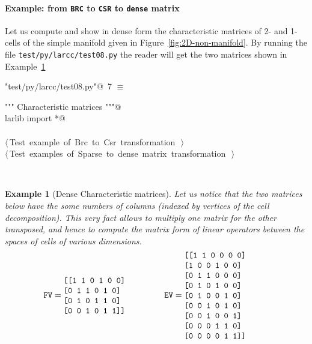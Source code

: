 \documentclass[11pt,oneside]{article}	%
\newtheorem{example}{Example}
\begin{document}
\paragraph{Example: from \texttt{BRC} to \texttt{CSR} to \texttt{dense} matrix} 
Let us compute and show in dense form the characteristic matrices of 2- and 1-cells of the simple manifold given in Figure~\ref{fig:2D-non-manifold}.
By running the file \texttt{test/py/larcc/test08.py} the reader will get the two matrices shown in Example~\ref{ex:denseMat}
\begin{flushleft} \small
\begin{minipage}{\linewidth} \label{scrap13}
\protect{}\verb@"test/py/larcc/test08.py"@\nobreak\ {\footnotesize 7 }$\equiv$
\vspace{-1ex}
\begin{list}{}{} \item
\mbox{}\verb@""" Characteristic matrices """@\\
\mbox{}\verb@from larlib import *@\\
\mbox{}\verb@@\\
\mbox{}\verb@@\hbox{$\langle\,$Test example of Brc to Csr transformation\nobreak\ {\footnotesize {}}$\,\rangle$}\verb@@\\
\mbox{}\verb@@\hbox{$\langle\,$Test examples of Sparse to dense matrix transformation\nobreak\ {\footnotesize {}}$\,\rangle$}\verb@@\\
\mbox{}\verb@@{\NWsep}
\end{list}
\vspace{-2ex}
\end{minipage}\\[4ex]
\end{flushleft}
 
\begin{example}[Dense Characteristic matrices]\label{ex:denseMat}
Let us notice that the two matrices below have the some numbers of columns (indexed by vertices of the cell decomposition).
This very fact allows to multiply one matrix for the other transposed, and hence to compute the matrix form of linear operators between the spaces of cells of various dimensions.
\[
\texttt{FV} =
\begin{minipage}[c]{0.29\linewidth}
\begin{verbatim}
[[1 1 0 1 0 0]
 [0 1 1 0 1 0]
 [0 1 0 1 1 0]
 [0 0 1 0 1 1]]
\end{verbatim}
\end{minipage}
\qquad
\texttt{EV} =
\begin{minipage}[c]{0.29\linewidth}
\begin{verbatim}
[[1 1 0 0 0 0]
 [1 0 0 1 0 0]
 [0 1 1 0 0 0]
 [0 1 0 1 0 0]
 [0 1 0 0 1 0]
 [0 0 1 0 1 0]
 [0 0 1 0 0 1]
 [0 0 0 1 1 0]
 [0 0 0 0 1 1]]
\end{verbatim}
\end{minipage}
\]
\end{example}
\end{document}
